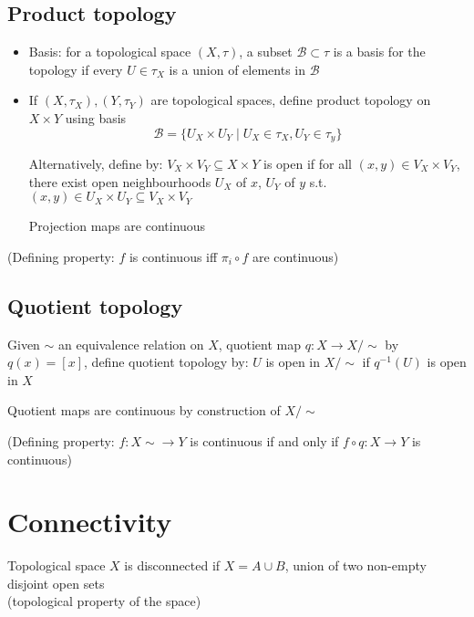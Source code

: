 \subsection*{Product topology}
\begin{itemize}
    \item Basis: for a topological space $(X,\tau)$, a subset $\mathcal{B} \subset \tau$ is a basis for the topology if every $U \in \tau_X$ is a union of elements in $\mathcal{B}$

    \item If $(X,\tau_X), (Y,\tau_Y)$ are topological spaces, define product topology on $X \times Y$ using basis
          \[\mathcal{B} = \{U_X \times U_Y \mid U_X \in \tau_X, U_Y \in \tau_y \} \]

          Alternatively, define by:
          $V_X \times V_Y \subseteq X \times Y $ is open if for all $(x,y) \in V_X \times V_Y$, there exist open neighbourhoods $U_X$ of $x$, $U_Y$ of $y$ s.t. $(x,y) \in U_X \times U_Y \subseteq V_X \times V_Y$

          Projection maps are continuous

\end{itemize}
(Defining property: $f$ is continuous iff $\pi_i \circ f$ are continuous)


\subsection*{Quotient topology}
Given $\sim$ an equivalence relation on $X$, quotient map $q: X \to X/\sim $ by $q(x) = [x]$,
define quotient topology by: $U$ is open in $X/\sim $ if $q^{-1}(U)$ is open in $X$

Quotient maps are continuous by construction of $X/\sim$

(Defining property: $f: X\sim \to Y$ is continuous if and only if $f \circ q : X \to Y$ is continuous)

\section{Connectivity}

Topological space $X$ is disconnected if $X = A \cup B$, union of two non-empty disjoint open sets \\ (topological property of the space)

